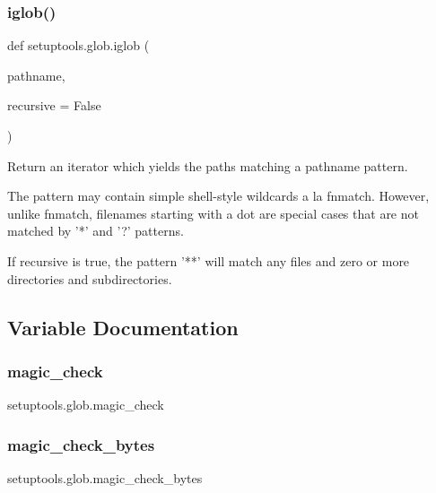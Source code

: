 \mbox{\label{namespacesetuptools_1_1glob_a785709f6dd54bc19304bb581cc6e7707}} 
\subsubsection{\texorpdfstring{iglob()}{iglob()}}
{\footnotesize\ttfamily def setuptools.\+glob.\+iglob (\begin{DoxyParamCaption}\item[{}]{pathname,  }\item[{}]{recursive = {\ttfamily False} }\end{DoxyParamCaption})}

\begin{DoxyVerb}Return an iterator which yields the paths matching a pathname pattern.

The pattern may contain simple shell-style wildcards a la
fnmatch. However, unlike fnmatch, filenames starting with a
dot are special cases that are not matched by '*' and '?'
patterns.

If recursive is true, the pattern '**' will match any files and
zero or more directories and subdirectories.
\end{DoxyVerb}
 

\subsection{Variable Documentation}
\mbox{\label{namespacesetuptools_1_1glob_a8b4aa8dfe849c42d139011a8050da833}} 
\subsubsection{\texorpdfstring{magic\+\_\+check}{magic\_check}}
{\footnotesize\ttfamily setuptools.\+glob.\+magic\+\_\+check}

\mbox{\label{namespacesetuptools_1_1glob_a6004b75354404430fa928ea3dd63792c}} 
\subsubsection{\texorpdfstring{magic\+\_\+check\+\_\+bytes}{magic\_check\_bytes}}
{\footnotesize\ttfamily setuptools.\+glob.\+magic\+\_\+check\+\_\+bytes}

